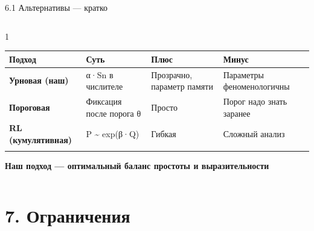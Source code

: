 \documentclass[
  ignorenonframetext,
  aspectratio=169,
  russian,
]{beamer}
\begin{document}
\begin{frame}{6.1 Альтернативы --- кратко}
\label{ux430ux43bux44cux442ux435ux440ux43dux430ux442ux438ux432ux44b-ux43aux440ux430ux442ux43aux43e}
\begin{columns}[T]
\begin{column}{1\linewidth}
\begin{longtable}[]{@{}
  >{\raggedright\arraybackslash}p{}
  >{\raggedright\arraybackslash}p{}
  >{\raggedright\arraybackslash}p{}
  >{\raggedright\arraybackslash}p{}@{}}
\toprule\noalign{}
\begin{minipage}[b]{\linewidth}\raggedright
Подход
\end{minipage} & \begin{minipage}[b]{\linewidth}\raggedright
Суть
\end{minipage} & \begin{minipage}[b]{\linewidth}\raggedright
Плюс
\end{minipage} & \begin{minipage}[b]{\linewidth}\raggedright
Минус
\end{minipage} \\
\midrule\noalign{}
\endhead
\textbf{Урновая (наш)} & α·Sn в числителе & Прозрачно, параметр памяти &
Параметры феноменологичны \\
\textbf{Пороговая} & Фиксация после порога θ & Просто & Порог надо знать
заранее \\
\textbf{RL (кумулятивная)} & P \textasciitilde{} exp(β·Q) & Гибкая &
Сложный анализ \\
\bottomrule\noalign{}
\end{longtable}

\textbf{Наш подход --- оптимальный баланс простоты и выразительности}
\end{column}
\end{columns}
\end{frame}

\section{7. Ограничения}\label{ux43eux433ux440ux430ux43dux438ux447ux435ux43dux438ux44f}
\end{document}
